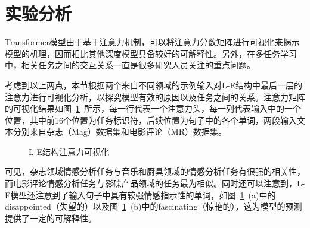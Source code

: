 \section{实验分析}
\label{sec:analysis}
Transformer模型由于基于注意力机制，可以将注意力分数矩阵进行可视化来揭示模型的机理，因而相比其他深度模型具备较好的可解释性。另外，在多任务学习中，相关任务之间的交互关系一直是很多研究人员关注的重点问题。

考虑到以上两点，本节根据两个来自不同领域的示例输入对L-E结构中最后一层的注意力进行可视化分析，以探究模型有效的原因以及任务之间的关系。注意力矩阵的可视化结果如图~\ref{fig:l-e-attn}~所示，每一行代表一个注意力头，每一列代表输入中的一个位置，其中前16个位置为任务标识符，后续位置为句子中的各个单词，两段输入文本分别来自杂志（Mag）数据集和电影评论（MR）数据集。

\begin{figure}[htb]
\centering


\caption{L-E结构注意力可视化}
\label{fig:l-e-attn}
\end{figure}

可见，杂志领域情感分析任务与音乐和厨具领域的情感分析任务有很强的相关性，而电影评论情感分析任务与影碟产品领域的任务最为相似。同时还可以注意到，L-E模型还注意到了输入句子中具有较强情感指示性的单词，如图~\ref{fig:l-e-attn}~(a)中的disappointed（失望的）以及图~\ref{fig:l-e-attn}~(b)中的fascinating（惊艳的），这为模型的预测提供了一定的可解释性。